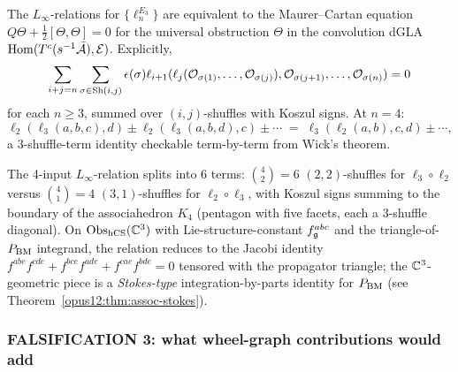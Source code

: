 \begin{proposition}\ClaimStatusProposition
\label{opus12:prop:assoc-mc}
The $L_\infty$-relations for $\{\ell_n^{E_3}\}$ are equivalent to the
Maurer--Cartan equation $Q \Theta + \frac{1}{2}[\Theta, \Theta] = 0$
for the universal obstruction $\Theta$ in the convolution dGLA
$\mathrm{Hom}(T^c(s^{-1}\bar{\mathcal{A}}), \mathcal{E})$. Explicitly,
\[
\sum_{i + j = n} \sum_{\sigma \in \mathrm{Sh}(i, j)} \epsilon(\sigma)
\ell_{i+1}(\ell_j(\mathcal{O}_{\sigma(1)}, \ldots, \mathcal{O}_{\sigma(j)}),
\mathcal{O}_{\sigma(j+1)}, \ldots, \mathcal{O}_{\sigma(n)}) = 0
\]
for each $n \ge 3$, summed over $(i, j)$-shuffles with Koszul signs.
At $n = 4$:
\[
\ell_2(\ell_3(a, b, c), d) \pm \ell_2(\ell_3(a, b, d), c) \pm \cdots
\;=\; \ell_3(\ell_2(a, b), c, d) \pm \cdots,
\]
a 3-shuffle-term identity checkable term-by-term from Wick's theorem.
\end{proposition}

\begin{remark}\ClaimStatusRemark
The 4-input $L_\infty$-relation splits into $6$ terms: $\binom{4}{2} = 6$
$(2,2)$-shuffles for $\ell_3 \circ \ell_2$ versus $\binom{4}{1} = 4$
$(3,1)$-shuffles for $\ell_2 \circ \ell_3$, with Koszul signs summing
to the boundary of the associahedron $K_4$ (pentagon with five
facets, each a 3-shuffle diagonal). On $\mathrm{Obs}_{\mathrm{hCS}}(\mathbb{C}^3)$ with
Lie-structure-constant $f^{abc}_{\mathfrak{g}}$ and the triangle-of-$P_{\mathrm{BM}}$
integrand, the relation reduces to the Jacobi identity
$f^{abe} f^{cde} + f^{bce} f^{ade} + f^{cae} f^{bde} = 0$ tensored
with the propagator triangle; the $\mathbb{C}^3$-geometric piece is a
\emph{Stokes-type} integration-by-parts identity for $P_{\mathrm{BM}}$
(see Theorem~\ref{opus12:thm:assoc-stokes}).
\end{remark}

\subsubsection{FALSIFICATION 3: what wheel-graph contributions would
add}

